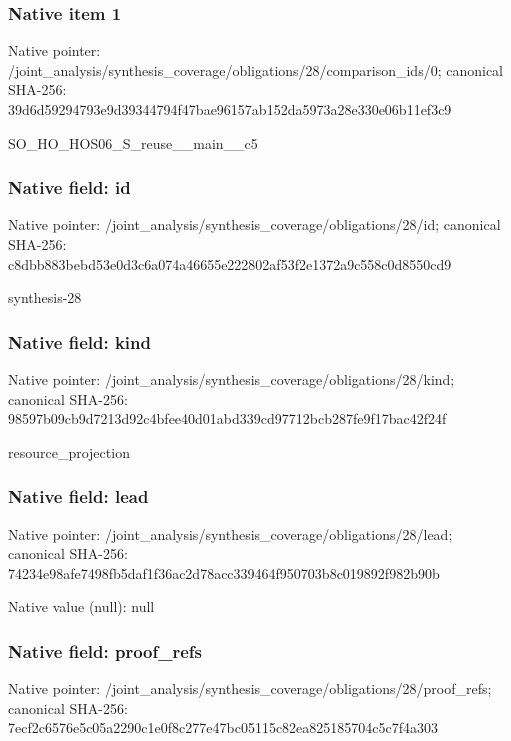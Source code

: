 \documentclass[10pt,a4paper]{article}
\begin{document}
\subsubsection{Native item 1}
Native pointer: /joint\_\allowbreak{}analysis/synthesis\_\allowbreak{}coverage/obligations/28/comparison\_\allowbreak{}ids/0; canonical SHA-256: 39d6d59294793e9d39344794f47bae96157ab152da5973a28e330e06b11ef3c9

\begingroup\raggedright\sloppy SO\_\allowbreak{}HO\_\allowbreak{}HOS06\_\allowbreak{}S\_\allowbreak{}reuse\_\allowbreak{}\_\allowbreak{}main\_\allowbreak{}\_\allowbreak{}c5\par\endgroup

\subsubsection{Native field: id}
Native pointer: /joint\_\allowbreak{}analysis/synthesis\_\allowbreak{}coverage/obligations/28/id; canonical SHA-256: c8dbb883bebd53e0d3c6a074a46655e222802af53f2e1372a9c558c0d8550cd9

\begingroup\raggedright\sloppy synthesis-28\par\endgroup

\subsubsection{Native field: kind}
Native pointer: /joint\_\allowbreak{}analysis/synthesis\_\allowbreak{}coverage/obligations/28/kind; canonical SHA-256: 98597b09cb9d7213d92c4bfee40d01abd339cd97712bcb287fe9f17bac42f24f

\begingroup\raggedright\sloppy resource\_\allowbreak{}projection\par\endgroup

\subsubsection{Native field: lead}
Native pointer: /joint\_\allowbreak{}analysis/synthesis\_\allowbreak{}coverage/obligations/28/lead; canonical SHA-256: 74234e98afe7498fb5daf1f36ac2d78acc339464f950703b8c019892f982b90b

Native value (null): null

\subsubsection{Native field: proof\_\allowbreak{}refs}
Native pointer: /joint\_\allowbreak{}analysis/synthesis\_\allowbreak{}coverage/obligations/28/proof\_\allowbreak{}refs; canonical SHA-256: 7ecf2c6576e5c05a2290c1e0f8c277e47bc05115c82ea825185704c5c7f4a303
\end{document}
